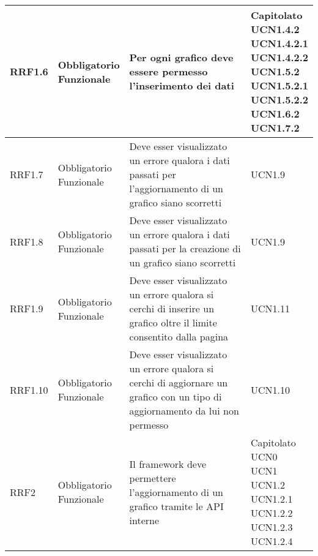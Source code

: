 \begin{longtabu}[c]{|X[0.7,l]|X[l]|X[2.5,l]|X[l]|}
                RRF1.6 & 
                \parbox[t]{4cm}{ Obbligatorio \\ Funzionale} & Per ogni grafico deve essere permesso l'inserimento dei dati & \parbox[t]{4cm}{Capitolato \\ UCN1.4.2 \\ UCN1.4.2.1 \\ UCN1.4.2.2 \\ UCN1.5.2 \\ UCN1.5.2.1 \\ UCN1.5.2.2 \\ UCN1.6.2 \\ UCN1.7.2 }  \\ 
                \hline
                
                RRF1.7 & 
                \parbox[t]{4cm}{ Obbligatorio \\ Funzionale} & Deve esser visualizzato un errore qualora i dati passati per l'aggiornamento di un grafico siano scorretti & \parbox[t]{4cm}{UCN1.9 }  \\ 
                \hline
                
                RRF1.8 & 
                \parbox[t]{4cm}{ Obbligatorio \\ Funzionale} & Deve esser visualizzato un errore qualora i dati passati per la creazione di un grafico siano scorretti & \parbox[t]{4cm}{UCN1.9 }  \\ 
                \hline
                
                RRF1.9 & 
                \parbox[t]{4cm}{ Obbligatorio \\ Funzionale} & Deve esser visualizzato un errore qualora si cerchi di inserire un grafico oltre il limite consentito dalla pagina & \parbox[t]{4cm}{UCN1.11 }  \\ 
                \hline
                
                RRF1.10 & 
                \parbox[t]{4cm}{ Obbligatorio \\ Funzionale} & Deve esser visualizzato un errore qualora si cerchi di aggiornare un grafico con un tipo di aggiornamento da lui non permesso & \parbox[t]{4cm}{UCN1.10 }  \\ 
                \hline
                
                RRF2 & 
                \parbox[t]{4cm}{ Obbligatorio \\ Funzionale} & Il framework deve permettere l'aggiornamento di un grafico tramite le API interne & \parbox[t]{4cm}{Capitolato \\ UCN0 \\ UCN1 \\ UCN1.2 \\ UCN1.2.1 \\ UCN1.2.2 \\ UCN1.2.3 \\ UCN1.2.4 }  \\ 
                \hline
                

\end{longtabu}
